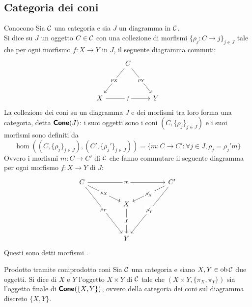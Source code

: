 \documentclass{article}
\renewcommand\C{\mc{C}}
\begin{document}
\subsection{Categoria dei coni}

\begin{definition}{Cono}{cono}
    Sia $\C$ una categoria e sia $J$ un diagramma in $\C$.\\
    Si dice  su $J$ un oggetto $C \in \C$ con una collezione di morfismi $\{\rho_j : C \to j\}_{j \in J}$ tale che per ogni morfismo $f : X\to Y$ in $J$, il seguente diagramma commuti:
    \[\begin{tikzcd}
	    & C \\
	    \\
	    X && Y
	    \arrow["{\rho_X}"{description}, from=1-2, to=3-1]
	    \arrow["{\rho_Y}"{description}, from=1-2, to=3-3]
	    \arrow["f"{description}, from=3-1, to=3-3]
    \end{tikzcd}\]
    La collezione dei coni su un diagramma $J$ e dei morfismi tra loro forma una categoria, detta $\text{\sffamily\textbf{Cone}}(J)$: i suoi oggetti sono i coni $(C,\{\rho_j\}_{j \in J})$ e i suoi morfismi sono definiti da 
    \[ \hom((C,\{\rho_j\}_{j \in J}), (C',\{\rho_j'\}_{j \in J})) = \{m : C\to C' : \forall j \in J, \rho_j = \rho_j' m\}\]
    Ovvero i morfismi $m:C\to C'$ di $\C$ che fanno commutare il seguente diagramma per ogni morfismo $f:X\to Y$ di $J$:
    \[\begin{tikzcd}
	    C &&&& {C'} \\
	    && X \\
    	\\
    	&& Y
    	\arrow["m"{description}, from=1-1, to=1-5]
    	\arrow["{\rho_X}"{description}, from=1-1, to=2-3]
    	\arrow["{\rho_Y}"{description}, from=1-1, to=4-3]
    	\arrow["{\rho_X'}"{description}, from=1-5, to=2-3]
    	\arrow["{\rho_Y'}"{description}, from=1-5, to=4-3]
	    \arrow["f"{description}, from=2-3, to=4-3]
    \end{tikzcd}\]
    Questi sono detti morfismi .
\end{definition}

\begin{definition}{Prodotto tramite coni}{prodotto coni}
    Sia $\C$ una categoria e siano $X,Y \in \ob\C$ due oggetti.
    Si dice  di $X$ e $Y$ l'oggetto $X\times Y$ di $\C$ tale che $(X\times Y, \{\pi_X, \pi_Y\})$ sia l'oggetto finale di $\text{\sffamily\textbf{Cone}}(\{X,Y\})$, ovvero della categoria dei coni sul diagramma discreto $\{X,Y\}$.
\end{definition}
\end{document}
